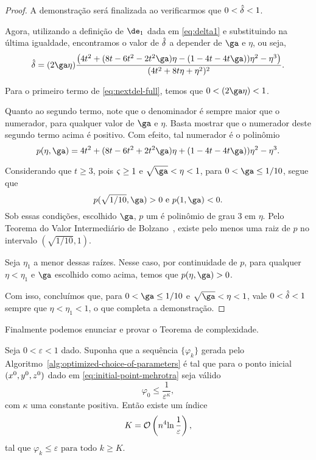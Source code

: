 \begin{proof}
	 A demonstração será finalizada ao verificarmos que $0<\hat{\delta}<1$.

Agora, utilizando a definição de $\de_1$ dada em \eqref{eq:delta1} e substituindo na última igualdade, encontramos o valor de $\hat{\delta}$ a depender de $\ga$ e $\eta$,  ou seja, 
	\begin{equation}
		\label{eq:nextdel-full}
		\nextdel = (2\ga\eta)\frac{\left(4 t^2 +(8t - 6t^2   -2t^2\ga) \eta - ( 1 - 4t    - 4t   \ga) ) \eta^2 - \eta^3\right)}{(4t^2 + 8t\eta + \eta^{2})^{2}}.
	\end{equation}

	Para o primeiro termo de \eqref{eq:nextdel-full}, temos que $0 < (2\ga\eta) <1$.

	Quanto ao segundo termo, note que o denominador é  sempre maior que o numerador, para qualquer  valor de $\ga$ e $\eta$. Basta mostrar que  o numerador deste segundo termo acima é positivo. Com efeito, tal numerador é o polinômio 
	\[
		p(\eta,\ga) =  4 t^2 + ( 8t - 6t^2 + 2t^2\ga) \eta + (1 - 4t - 4t   \ga) ) \eta^2 - \eta^3. 
	\]

	Considerando que $t\geq3$, pois $\varsigma\geq1$ e $\sqrt{\ga}<\eta<1$, para $0 < \ga \leq 1/10$, segue que
	\[p(\sqrt{1/10},\ga) >0 \text{ e  } p(1,\ga) <0.\]
	Sob essas condições, escolhido $\ga$,  $p$ um é polinômio de grau 3 em $\eta$. Pelo Teorema do Valor Intermediário de Bolzano~\cite[Teorema 5.3.7]{Bartle:2011tr},  existe pelo menos uma  raiz  de $p$ no intervalo $(\sqrt{1/10},1)$. 

	Seja $\eta_{1}$ a menor dessas raízes. Nesse caso, por continuidade de $p$, para qualquer $\eta  < \eta_{1}$ e $\ga$ escolhido como acima, temos que  $p(\eta,\ga) >0$. 

	Com isso, concluímos que,  para $0 < \ga \leq 1/10$ e  $\sqrt{\ga}<\eta<1$, vale  $0<\hat{\delta}<1$  sempre que $\eta < \eta_{1} < 1$, o que completa a demonstração.
\end{proof}








Finalmente podemos enunciar e provar o Teorema de complexidade. 


\begin{teo}
	\label{teo:alg-convergence-varphi} Seja $0 < \varepsilon <1$ dado. Suponha que a sequência $\{\varphi_{k}\}$ gerada pelo Algoritmo~\ref{alg:optimized-choice-of-parameters} é  tal que 
	para o ponto inicial $(x^0,y^0,z^0)$ dado em \eqref{eq:initial-point-mehrotra} seja válido	
	\begin{equation}
	\label{eq:varphi0-eps-kappa}
		\varphi_{0}\leq \dfrac{1}{\varepsilon^{\kappa}},
	\end{equation} 
	com  $\kappa$ uma constante positiva. Então  existe um índice \[K =  \mathcal{O}\left(n^{4}{\ln\frac{1}{\varepsilon}}\right),\] tal que 
	 $\varphi_{k}\leq \varepsilon \text{ para todo } k \geq K$.
	 
\end{teo}

